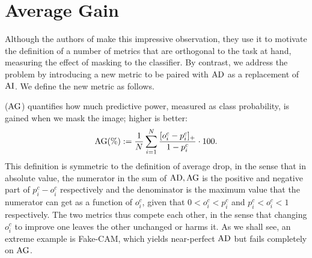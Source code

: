 \section{Average Gain}
\label{sec:av_gain}
Although the authors of \cite{poppi2021revisiting} make this impressive observation, they use it to motivate the definition of a number of metrics that are orthogonal to the task at hand, \ie measuring the effect of masking to the classifier. By contrast, we address the problem by introducing a new metric to be paired with $\operatorname{AD}$ as a replacement of $\operatorname{AI}$. We define the new metric as follows.

\emph{\Agf} ($\operatorname{AG}$) quantifies how much predictive power, measured as class probability, is gained when we mask the image; higher is better:
\begin{equation}
	\operatorname{AG}(\%) \mathrel{:=} \frac{1}{N} \sum_{i=1}^N \frac{[o^c_i - p^c_i]_+}{1-p^c_i} \cdot 100.
\label{eq:ag}
\end{equation}
This definition is symmetric to the definition of average drop, in the sense that in absolute value, the numerator in the sum of $\operatorname{AD}, \operatorname{AG}$ is the positive and negative part of $p^c_i - o^c_i$ respectively and the denominator is the maximum value that the numerator can get as a function of $o^c_i$, given that $0 < o^c_i < p^c_i$ and $p^c_i < o^c_i < 1$ respectively. The two metrics thus compete each other, in the sense that changing $o^c_i$ to improve one leaves the other unchanged or harms it. As we shall see, an extreme example is Fake-CAM, which yields near-perfect $\operatorname{AD}$ but fails completely on $\operatorname{AG}$.

